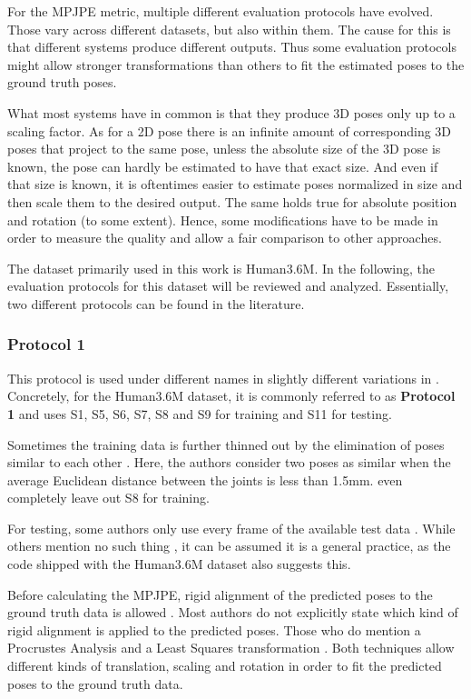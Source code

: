 For the MPJPE metric, multiple different evaluation protocols have evolved.
Those vary across different datasets, but also within them.
The cause for this is that different systems produce different outputs. 
Thus some evaluation protocols might allow stronger transformations than others to fit the estimated poses to the ground truth poses.

What most systems have in common is that they produce 3D poses only up to a scaling factor.
As for a 2D pose there is an infinite amount of corresponding 3D poses that project to the same pose, unless the absolute size of the 3D pose is known, the pose can hardly be estimated to have that exact size.
And even if that size is known, it is oftentimes easier to estimate poses normalized in size and then scale them to the desired output.
The same holds true for absolute position and rotation (to some extent).
Hence, some modifications have to be made in order to measure the quality and allow a fair comparison to other approaches.

The dataset primarily used in this work is Human3.6M.
In the following, the evaluation protocols for this dataset will be reviewed and analyzed.
Essentially, two different protocols can be found in the literature.

\subsubsection{Protocol 1}

This protocol is used under different names in slightly different variations in \cite{sun17, drover18, moreno-noguer16, yasin16, kostrikov14, tome17}.
Concretely, for the Human3.6M dataset, it is commonly referred to as \textbf{Protocol 1} and uses S1, S5, S6, S7, S8 and S9 for training and S11 for testing.

Sometimes the training data is further thinned out by the elimination of poses similar to each other \cite{yasin16}.
Here, the authors consider two poses as similar when the average Euclidean distance between the joints is less than 1.5mm.
\citet{drover18} even completely leave out S8 for training.

For testing, some authors only use every  frame of the available test data \cite{sun17, chen17, yasin16, moreno-noguer16, tome17}.
While others mention no such thing \cite{drover18, kostrikov14}, it can be assumed it is a general practice, as the code shipped with the Human3.6M dataset also suggests this.

Before calculating the MPJPE, rigid alignment of the predicted poses to the ground truth data is allowed  \cite{drover18, yasin16, kostrikov14, sun17, tome17, chen17}.
Most authors do not explicitly state which kind of rigid alignment is applied to the predicted poses.
Those who do mention a Procrustes Analysis \cite{sun17, tome17} and a Least Squares transformation \cite{kostrikov14}.
Both techniques allow different kinds of translation, scaling and rotation in order to fit the predicted poses to the ground truth data.

